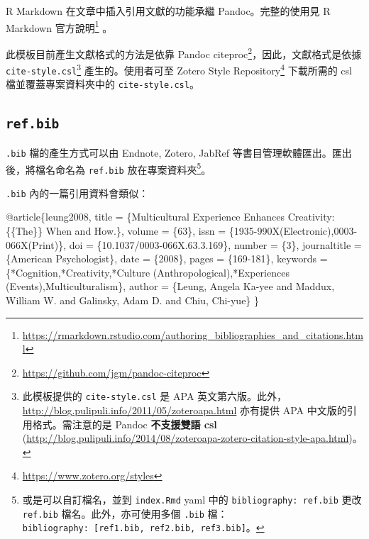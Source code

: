 \documentclass[oneside]{book}
\newenvironment{Shaded}{\begin{snugshade}}{\end{snugshade}}
\newcommand{\DataTypeTok}[1]{\textcolor[rgb]{0.13,0.29,0.53}{#1}}
\newcommand{\OtherTok}[1]{\textcolor[rgb]{0.56,0.35,0.01}{#1}}
\newcommand{\VariableTok}[1]{\textcolor[rgb]{0.00,0.00,0.00}{#1}}
\newcommand{\NormalTok}[1]{#1}
\renewcommand{\href}[2]{#2\footnote{\url{#1}}}
\theoremstyle{definition}
\theoremstyle{definition}
\theoremstyle{definition}
\theoremstyle{remark}
\begin{document}
R Markdown 在文章中插入引用文獻的功能承繼 Pandoc。完整的使用見
\href{https://rmarkdown.rstudio.com/authoring_bibliographies_and_citations.html}{R
Markdown 官方說明} 。

此模板目前產生文獻格式的方法是依靠
\href{https://github.com/jgm/pandoc-citeproc}{Pandoc
citeproc}，因此，文獻格式是依據 \texttt{cite-style.csl}\footnote{此模板提供的
  \texttt{cite-style.csl} 是 APA
  英文第六版。此外，\url{http://blog.pulipuli.info/2011/05/zoteroapa.html}
  亦有提供 APA 中文版的引用格式。需注意的是 Pandoc \textbf{不支援雙語
  csl}
  (\url{http://blog.pulipuli.info/2014/08/zoteroapa-zotero-citation-style-apa.html})。}
產生的。使用者可至 \href{https://www.zotero.org/styles}{Zotero Style
Repository} 下載所需的 csl 檔並覆蓋專案資料夾中的
\texttt{cite-style.csl}。

\subsection{\texorpdfstring{\texttt{ref.bib}}{ref.bib}}\label{ref-bib}

\texttt{.bib} 檔的產生方式可以由 Endnote, Zotero, JabRef
等書目管理軟體匯出。匯出後，將檔名命名為 \texttt{ref.bib}
放在專案資料夾\footnote{或是可以自訂檔名，並到 \texttt{index.Rmd} yaml
  中的 \texttt{bibliography:\ ref.bib} 更改 \texttt{ref.bib}
  檔名。此外，亦可使用多個 \texttt{.bib}
  檔：\texttt{bibliography:\ {[}ref1.bib,\ ref2.bib,\ ref3.bib{]}}。}。

\texttt{.bib} 內的一篇引用資料會類似：

\begin{Shaded}
\begin{Highlighting}[]
\VariableTok{@article}\NormalTok{\{}\OtherTok{leung2008}\NormalTok{,}
  \DataTypeTok{title}\NormalTok{ = \{Multicultural Experience Enhances Creativity: \{\{The\}\} When and How.\},}
  \DataTypeTok{volume}\NormalTok{ = \{63\},}
  \DataTypeTok{issn}\NormalTok{ = \{1935-990X(Electronic),0003-066X(Print)\},}
  \DataTypeTok{doi}\NormalTok{ = \{10.1037/0003-066X.63.3.169\},}
  \DataTypeTok{number}\NormalTok{ = \{3\},}
  \DataTypeTok{journaltitle}\NormalTok{ = \{American Psychologist\},}
  \DataTypeTok{date}\NormalTok{ = \{2008\},}
  \DataTypeTok{pages}\NormalTok{ = \{169-181\},}
  \DataTypeTok{keywords}\NormalTok{ = \{*Cognition,*Creativity,*Culture (Anthropological),*Experiences (Events),Multiculturalism\},}
  \DataTypeTok{author}\NormalTok{ = \{Leung, Angela Ka-yee and Maddux, William W. and Galinsky, Adam D. and Chiu, Chi-yue\}}
\NormalTok{\}}
\end{Highlighting}
\end{Shaded}
\end{document}
